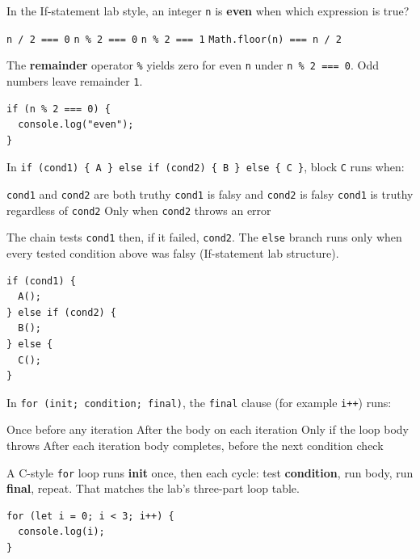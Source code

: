 \question[4]
In the If-statement lab style, an integer \texttt{n} is \textbf{even} when which expression is true?
\begin{choices}
  \choice \texttt{n / 2 === 0}
  \CorrectChoice \texttt{n \% 2 === 0}
  \choice \texttt{n \% 2 === 1}
  \choice \texttt{Math.floor(n) === n / 2}
\end{choices}
\begin{solution}
  The \textbf{remainder} operator \texttt{\%} yields zero for even \texttt{n} under \texttt{n \% 2 === 0}. Odd numbers leave remainder \texttt{1}.
\begin{lstlisting}[style=js]
if (n % 2 === 0) {
  console.log("even");
}
\end{lstlisting}
\end{solution}

\question[4]
In \texttt{if (cond1) \{ A \} else if (cond2) \{ B \} else \{ C \}}, block \texttt{C} runs when:
\begin{choices}
  \choice \texttt{cond1} and \texttt{cond2} are both truthy
  \CorrectChoice \texttt{cond1} is falsy and \texttt{cond2} is falsy
  \choice \texttt{cond1} is truthy regardless of \texttt{cond2}
  \choice Only when \texttt{cond2} throws an error
\end{choices}
\begin{solution}
  The chain tests \texttt{cond1} then, if it failed, \texttt{cond2}. The \texttt{else} branch runs only when every tested condition above was falsy (If-statement lab structure).
\begin{lstlisting}[style=js]
if (cond1) {
  A();
} else if (cond2) {
  B();
} else {
  C();
}
\end{lstlisting}
\end{solution}

\newpage

\question[4]
In \texttt{for (init; condition; final)}, the \texttt{final} clause (for example \texttt{i++}) runs:
\begin{choices}
  \choice Once before any iteration
  \choice After the body on each iteration
  \choice Only if the loop body throws
  \CorrectChoice After each iteration body completes, before the next condition check
\end{choices}
\begin{solution}
  A C-style \texttt{for} loop runs \textbf{init} once, then each cycle: test \textbf{condition}, run body, run \textbf{final}, repeat. That matches the lab's three-part loop table.
\begin{lstlisting}[style=js]
for (let i = 0; i < 3; i++) {
  console.log(i);
}
\end{lstlisting}
\end{solution}


